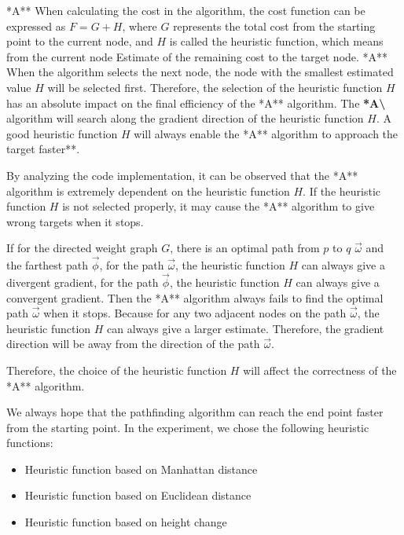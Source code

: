 \documentclass[
]{article}
\begin{document}
*A** When calculating the cost in the algorithm, the cost function can
be expressed as \(F = G + H \), where \(G\) represents the total cost
from the starting point to the current node, and \(H\) is called the
heuristic function, which means from the current node Estimate of the
remaining cost to the target node. *A** When the algorithm selects the
next node, the node with the smallest estimated value \(H\) will be
selected first. Therefore, the selection of the heuristic function \(H\)
has an absolute impact on the final efficiency of the *A** algorithm.
The \textbf{*A\textbackslash{}} algorithm will search along the gradient
direction of the heuristic function \(H\). A good heuristic function
\(H\) will always enable the *A** algorithm to approach the target
faster**.

By analyzing the code implementation, it can be observed that the *A**
algorithm is extremely dependent on the heuristic function \(H\). If the
heuristic function \(H\) is not selected properly, it may cause the *A**
algorithm to give wrong targets when it stops.

If for the directed weight graph \(G\), there is an optimal path from
\(p\) to \(q\) \(\overrightarrow{\omega}\) and the farthest path
\(\overrightarrow{\phi}\), for the path \(\overrightarrow {\omega}\),
the heuristic function \(H\) can always give a divergent gradient, for
the path \(\overrightarrow{\phi}\), the heuristic function \(H\) can
always give a convergent gradient. Then the *A** algorithm always fails
to find the optimal path \(\overrightarrow{\omega}\) when it stops.
Because for any two adjacent nodes on the path
\(\overrightarrow{\omega}\), the heuristic function \(H\) can always
give a larger estimate. Therefore, the gradient direction will be away
from the direction of the path \(\overrightarrow{\omega}\).

Therefore, the choice of the heuristic function \(H\) will affect the
correctness of the *A** algorithm.

We always hope that the pathfinding algorithm can reach the end point
faster from the starting point. In the experiment, we chose the
following heuristic functions:

\begin{itemize}
\item
  Heuristic function based on Manhattan distance
\item
  Heuristic function based on Euclidean distance
\item
  Heuristic function based on height change
\end{itemize}
\end{document}
